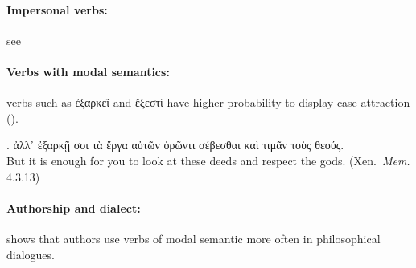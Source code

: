 \documentclass[a4paper, 12pt, article]{memoir}
\begin{document}
\paragraph{Impersonal verbs:} see~\textcite{Humbert1945}


\paragraph{Verbs with modal semantics:} verbs such as ἐξαρκεῖ and ἔξεστί have higher
probability to display case attraction (\cite{Geraldes2020,Geraldes2023}).


\ex.\label{gloss:mod} ἀλλ᾽ ἐξαρκῇ σοι τὰ ἔργα αὐτῶν ὁρῶντι σέβεσθαι καὶ τιμᾶν τοὺς θεούς.\\
But it is enough for you to look at these deeds and respect the gods. 
(Xen.\ \emph{Mem.} 4.3.13)



%
%

\paragraph{Authorship and dialect:} \textcite{Geraldes2020,Geraldes2023} shows
that authors use verbs of modal semantic more often in philosophical dialogues.
\end{document}
